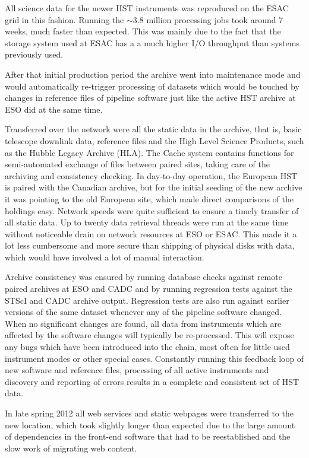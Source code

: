 All science data for the newer HST instruments was reproduced on the ESAC grid in this fashion. Running the $\sim$3.8 million processing jobs took around 7 weeks, much faster than expected. This was mainly due to the fact that the storage system used at ESAC has a a much higher I/O throughput than systems previously used.

After that initial production period the archive went into maintenance mode and would automatically re-trigger processing of datasets which would be touched by changes in reference files of pipeline software just like the active HST archive at ESO did at the same time.

Transferred over the network were all the static data in the archive, that is, basic telescope downlink data, reference files and the High Level Science Products, such as the Hubble Legacy Archive (HLA). The  Cache system contains functions for semi-automated exchange of files between paired sites, taking care of the archiving and consistency checking. In day-to-day operation, the European HST is paired with the Canadian archive, but for the initial seeding of the new archive  it was pointing to the old European site, which made direct comparisons of the holdings easy. Network speeds were quite sufficient to ensure a timely transfer of all static data. Up to twenty data retrieval threads were run at the same time without noticeable drain on network resources at ESO or ESAC. This made it a lot less cumbersome and more secure than shipping of physical disks with data, which would have involved a lot of manual interaction.

Archive consistency was  ensured by running database checks against remote paired archives at ESO and CADC and by running regression tests against the STScI and CADC archive output. Regression tests are also run against earlier versions of the same dataset whenever any of the pipeline software changed. When no significant changes are found, all data from instruments which are affected by the software changes will typically be re-processed. This will expose any bugs which have been introduced into the chain, most often for little used instrument modes or other special cases. Constantly  running this feedback loop of new software and reference files, processing of all active instruments and discovery and reporting of errors results in a complete and consistent set of HST data. 

In late spring 2012 all web services and static webpages were transferred to the new location, which took slightly longer than expected due to the large amount of dependencies in the front-end software that had to be reestablished and the slow work of migrating web content.

